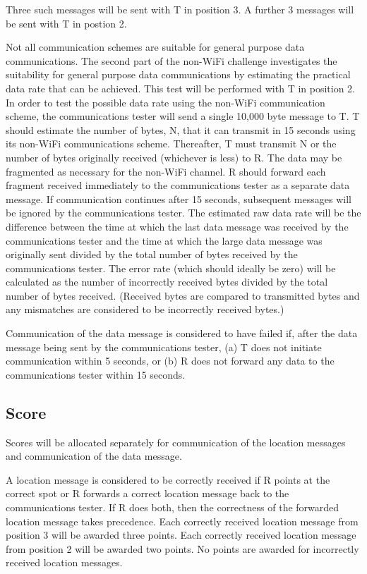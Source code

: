 \documentclass[12pt]{article}
\begin{document}
Three such messages will be sent with T in position 3. A further 3 messages will be sent with T in postion 2.

Not all communication schemes are suitable for general purpose data communications. The second part of the non-WiFi challenge investigates the suitability for general purpose data communications by estimating the practical data rate that can be achieved. This test will be performed with T in position 2.
In order to test the possible data rate using the non-WiFi communication scheme, the communications tester will send a single 10,000 byte message to T. T should estimate the number of bytes, N, that it can transmit in 15 seconds using its non-WiFi communications scheme. Thereafter, T must transmit N or the number of bytes originally received (whichever is less) to R. The data may be fragmented as necessary for the non-WiFi channel. R should forward each fragment received immediately to the communications tester as a separate data message. If communication continues after 15 seconds, subsequent messages will be ignored by the communications tester. The estimated raw data rate will be the difference between the time at which the last data message was received by the communications tester and the time at which the large data message was originally sent divided by the total number of bytes received by the communications tester. The error rate (which should ideally be zero) will be calculated as the number of incorrectly received bytes divided by the total number of bytes received. (Received bytes are compared to transmitted bytes and any mismatches are considered to be incorrectly received bytes.)

Communication of the data message is considered to have failed if, after the data message being sent by the communications tester, (a) T does not initiate communication within 5 seconds, or (b) R does not forward any data to the communications tester within 15 seconds.

\subsection{Score}
Scores will be allocated separately for communication of the location messages and communication of the data message.

A location message is considered to be correctly received if R points at the correct spot or R forwards a correct location message back to the communications tester. If R does both, then the correctness of the forwarded location message takes precedence.
Each correctly received location message from position 3 will be awarded three points. Each correctly received location message from position 2 will be awarded two points. No points are awarded for incorrectly received location messages.
\end{document}
